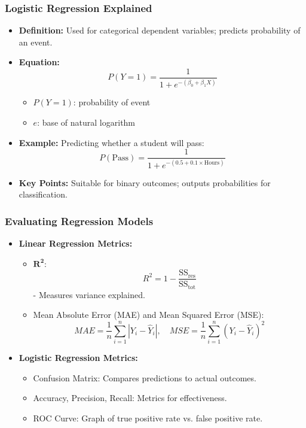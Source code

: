 \documentclass[aspectratio=169]{beamer}
\begin{document}
\begin{frame}[fragile]
    \frametitle{Logistic Regression Explained}
    \begin{itemize}
        \item \textbf{Definition:} Used for categorical dependent variables; predicts probability of an event.
        \item \textbf{Equation:}
        \begin{equation}
        P(Y=1) = \frac{1}{1 + e^{-(\beta_0 + \beta_1X)}}
        \end{equation}
        \begin{itemize}
            \item \(P(Y=1)\): probability of event
            \item \(e\): base of natural logarithm
        \end{itemize}
        \item \textbf{Example:} Predicting whether a student will pass:
        \begin{equation}
        P(\text{Pass}) = \frac{1}{1 + e^{-(0.5 + 0.1 \times \text{Hours})}}
        \end{equation}
        \item \textbf{Key Points:} Suitable for binary outcomes; outputs probabilities for classification.
    \end{itemize}
\end{frame}

\begin{frame}[fragile]
    \frametitle{Evaluating Regression Models}
    \begin{itemize}
        \item \textbf{Linear Regression Metrics:}
        \begin{itemize}
            \item \(\mathbf{R^2}\): 
            \begin{equation}
            R^2 = 1 - \frac{\text{SS}_{\text{res}}}{\text{SS}_{\text{tot}}}
            \end{equation}
                - Measures variance explained.
            \item Mean Absolute Error (MAE) and Mean Squared Error (MSE):
            \begin{equation}
            MAE = \frac{1}{n}\sum_{i=1}^n |Y_i - \hat{Y}_i|, \quad MSE = \frac{1}{n}\sum_{i=1}^n (Y_i - \hat{Y}_i)^2
            \end{equation}
        \end{itemize}
        
        \item \textbf{Logistic Regression Metrics:}
        \begin{itemize}
            \item Confusion Matrix: Compares predictions to actual outcomes.
            \item Accuracy, Precision, Recall: Metrics for effectiveness.
            \item ROC Curve: Graph of true positive rate vs. false positive rate.
        \end{itemize}
    \end{itemize}
\end{frame}
\end{document}
